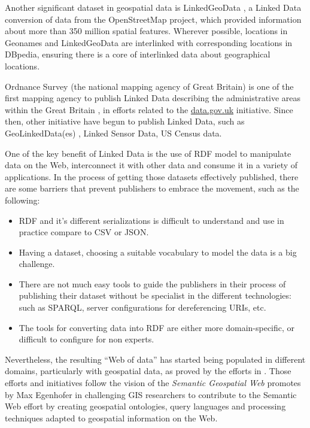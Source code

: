 Another significant dataset in geospatial data is LinkedGeoData \cite{linkedgeodata}, a Linked Data conversion of data from the OpenStreetMap project, which provided information about more than 350 million spatial features. Wherever possible, locations in Geonames and LinkedGeoData are interlinked with corresponding locations in DBpedia, ensuring there is a core of interlinked data about geographical locations.

Ordnance Survey (the national mapping agency of Great Britain) is one of the first mapping agency to publish Linked Data describing the administrative areas within the Great Britain \cite{Goodwin2008}, in efforts related to the \url{data.gov.uk} initiative. Since then, other initiative have begun to publish Linked Data, such as GeoLinkedData(es) \cite{deLeon2010}, Linked Sensor Data, US Census data. 

One of the key benefit of Linked Data is the use of RDF model to manipulate data on the Web, interconnect it with other data and consume it in a variety of applications. In the process of getting those datasets effectively published, there are some barriers that prevent publishers to embrace the movement, such as the following:
\begin{itemize}
\item RDF and it's different serializations is difficult to understand and use in practice compare to CSV or JSON.
\item Having a dataset, choosing a suitable vocabulary to model the data is a big challenge.
\item There are not much easy tools to guide the publishers in their process of publishing their dataset without be specialist in the different technologies: such as SPARQL, server configurations for dereferencing URIs, etc.
\item The tools for converting data into RDF are either more domain-specific, or difficult to configure for non experts.
\end{itemize}

Nevertheless, the resulting ``Web of data'' has started being populated in different domains, particularly with geospatial data, as proved by the efforts in \cite{goodwin08,linkedgeodata,deLeon2010,Salas2011}. Those efforts and initiatives follow the vision of the \textit{Semantic Geospatial Web} promotes by Max Egenhofer in \cite{egenhofer12} challenging GIS researchers to contribute to the Semantic Web effort by creating geospatial ontologies, query languages and processing techniques adapted to geospatial information on the Web. 

